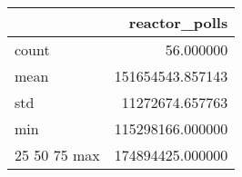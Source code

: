 \begin{tabular}{lr}
\toprule
 & reactor\_polls \\
\midrule
count & 56.000000 \\
mean & 151654543.857143 \\
std & 11272674.657763 \\
min & 115298166.000000 \\
25%
50%
75%
max & 174894425.000000 \\
\bottomrule
\end{tabular}

